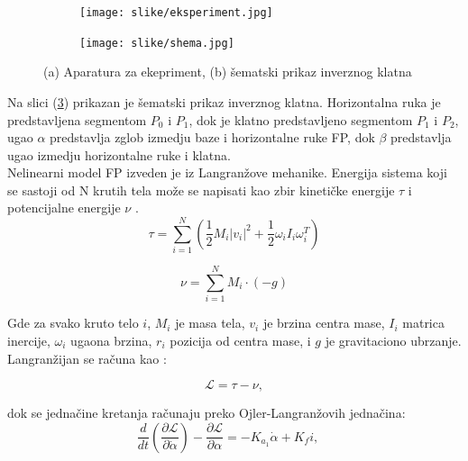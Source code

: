 \documentclass[a4paper,11pt]{article}
\theoremstyle{definition} \newtheorem{deff}{Definicija}[section]
\theoremstyle{definition} \newtheorem{prim}[deff]{Primer}
\theoremstyle{plain} \newtheorem{teor}[deff]{Teorema}
\begin{document}
	
	\begin{figure}[!htb]
		\centering
		\begin{subfigure}{0.3\linewidth}
			\centering
			\texttt{[image: slike/eksperiment.jpg]}
			\caption{}
			\label{fig:eksper}
		\end{subfigure}
		\hfill
		\begin{subfigure}{0.5\linewidth}
			\centering
			\texttt{[image: slike/shema.jpg]}
			\caption{}
			\label{fig:schema}
		\end{subfigure}
		\caption{(a) Aparatura za ekepriment, (b) šematski prikaz inverznog klatna \cite{inicijalna} }
	\end{figure}
	
	
	Na slici (\ref{fig:schema}) prikazan je šematski prikaz inverznog klatna. Horizontalna ruka je predstavljena segmentom $P_0$ i $P_1$, dok je klatno predstavljeno segmentom $P_1$ i $P_2$, ugao $\alpha$ predstavlja zglob izmedju baze i horizontalne ruke FP, dok $\beta$ predstavlja ugao izmedju horizontalne ruke i klatna.
	\\
	
	Nelinearni model FP izveden je iz Langranžove mehanike. Energija sistema koji se sastoji od N krutih tela može se napisati kao zbir kinetičke energije $\tau$ i potencijalne energije $\nu$ \cite{inicijalna}. 
	\begin{equation}
		\tau = \sum_{i=1}^{N} \left( \frac{1}{2} M_i |v_i|^2 + \frac{1}{2} \omega_i I_i \omega_i^T \right)
	\end{equation}
	
	\begin{equation}
		\nu = \sum_{i=1}^{N} M_i \cdot (-g)
	\end{equation}
	
	
	
	Gde za svako kruto telo $i$, $M_i$ je masa tela, $v_i$ je brzina centra mase, $I_i$ matrica inercije, $\omega_i$ ugaona brzina, $r_i$ pozicija od centra mase, i $g$ je gravitaciono ubrzanje.\\
	
	\newpage
	Langranžijan se računa kao :
	
	\begin{equation}
		\mathcal{L} = \tau - \nu, 
	\end{equation}
	
	dok se jednačine kretanja računaju preko Ojler-Langranžovih jednačina: 
	\begin{equation}
		\frac{d}{dt} \left(\frac{\partial \mathcal{L}}{\partial \dot\alpha}\right) - \frac{\partial \mathcal{L}}{\partial \alpha} = -K_{a_1} \dot\alpha + K_f i, \quad 
	\end{equation}
	
\end{document}
